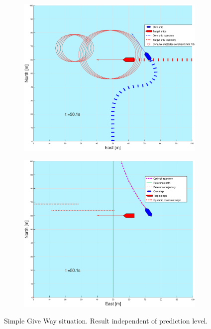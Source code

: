 \begin{figure}[ht!]
\begin{subfigure}[b]{0.499\textwidth}
    \end{subfigure}
    \hfill
    \\
    \begin{subfigure}[b]{0.49\textwidth}
        \centering
        \includegraphics[width=\textwidth]{Images/Figures/enkel_GW/_Simple_0fig1_time=50}
    \end{subfigure}
    \hfill
    \begin{subfigure}[b]{0.499\textwidth}
        \centering
        \includegraphics[width=\textwidth]{Images/Figures/enkel_GW/_Simple_0fig999_time=50}
    \end{subfigure}
    \hfill
    \caption{Simple Give Way situation. Result independent of prediction level.}
    \label{FIG: simple GW}
\end{figure}%
